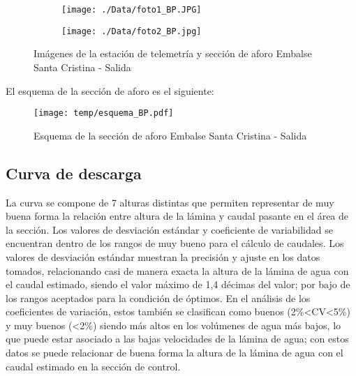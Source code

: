 \documentclass[]{article}
\begin{document}
\begin{figure}[H]
  \centering
\begin{subfigure}{.49\textwidth}
  \texttt{[image: ./Data/foto1\_BP.JPG]}
\end{subfigure}
\hfill
\begin{subfigure}{.49\textwidth}
  \texttt{[image: ./Data/foto2\_BP.jpg]}
\end{subfigure}
\caption{Imágenes de la estación de telemetría y sección de aforo Embalse Santa Cristina - Salida}
\label{fig:fotos_42}
\end{figure}

El esquema de la sección de aforo es el siguiente:

\begin{figure}[H]
  \centering
  \texttt{[image: temp/esquema\_BP.pdf]}
\caption{Esquema de la sección de aforo Embalse Santa Cristina - Salida}
\label{fig:Esquema_BP}
\end{figure}

\subsection{Curva de descarga}\label{curva-de-descarga-41}

La curva se compone de 7 alturas distintas que permiten representar de muy buena forma la relación entre altura de la lámina y caudal pasante en el área de la sección. Los valores de desviación estándar y coeficiente de variabilidad se encuentran dentro de los rangos de muy bueno para el cálculo de caudales. Los valores de desviación estándar muestran la precisión y ajuste en los datos tomados, relacionando casi de manera exacta la altura de la lámina de agua con el caudal estimado, siendo el valor máximo de 1,4 décimas del valor; por bajo de los rangos aceptados para la condición de óptimos. En el análisis de los coeficientes de variación, estos también se clasifican como buenos (2\%<CV<5\%) y muy buenos (<2\%) siendo más altos en los volúmenes de agua más bajos, lo que puede estar asociado a las bajas velocidades de la lámina de agua; con estos datos se puede relacionar de buena forma la altura de la lámina de agua con el caudal estimado en la sección de control.
\end{document}
